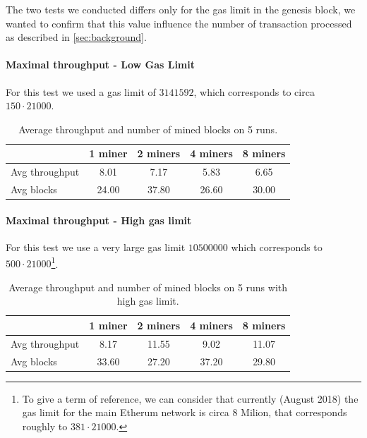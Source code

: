 The two tests we conducted differs only for the gas limit in the genesis block,
we wanted to confirm that this value influence the number of transaction 
processed as described in \autoref{sec:background}.


\paragraph{Maximal throughput - Low Gas Limit}
\label{sec:max-troughput}
For this test we used a gas limit of $3141592$, which corresponds to circa
$150 \cdot 21000$.

\begin{table}[h]
  \centering
  \begin{tabular}{lcccc}
    \hline
    & 1 miner & 2 miners & 4 miners & 8 miners \\ \hline
    Avg throughput & 8.01 & 7.17 & 5.83 & 6.65 \\ \hline
    Avg blocks & 24.00 & 37.80 & 26.60 & 30.00 \\ \hline
  \end{tabular}
  \caption{Average throughput and number of mined blocks on 5 runs.}
  \label{tab:max-troughput}
\end{table}


\paragraph{Maximal throughput - High gas limit}
\label{sec:max-throughput-high-gaslimit}
For this test we use a very large gas limit $10500000$ which corresponds to
$500 \cdot 21000$\footnote{To give a term of reference, we can consider that 
currently (August 2018) the gas limit for the main Etherum network is circa $8$ 
Milion, that corresponds roughly to $381 \cdot 21000$.}.

\begin{table}[h]
  \centering
  \begin{tabular}{lcccc}
    \hline
    & 1 miner & 2 miners & 4 miners & 8 miners \\ \hline
    Avg throughput & 8.17 & 11.55 & 9.02 & 11.07 \\ \hline
    Avg blocks & 33.60 & 27.20 & 37.20 & 29.80 \\ \hline
  \end{tabular}
  \caption{Average throughput and number of mined blocks on 5 runs with high gas limit.}
  \label{tab:max-troughput-high-gaslimit}
\end{table}
